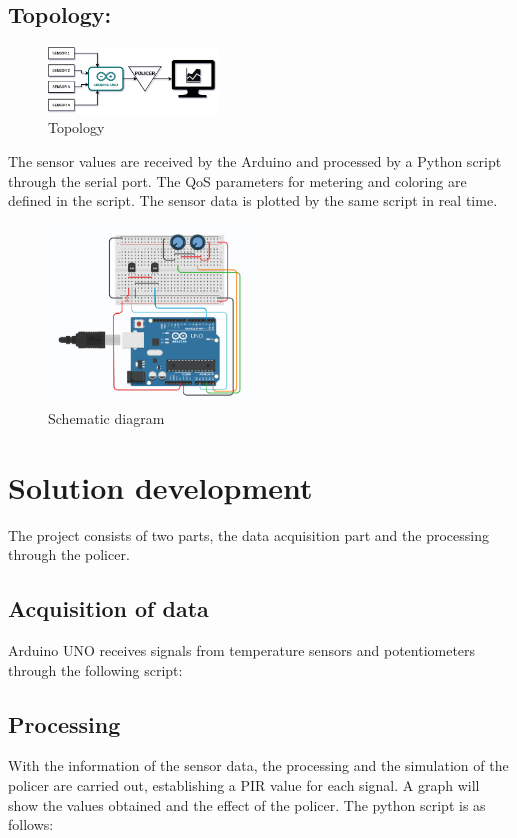 \documentclass[conference]{IEEEtran}
\begin{document}
\subsection{\textbf{ Topology:}}
\begin{figure}[h]
	\centerline{\includegraphics[width=0.4\textwidth]{img/topology01.png}}
	\caption{Topology}
	\label{fig:top01}
\end{figure}
The sensor values are received by the Arduino and processed by a Python script through the serial port. The QoS parameters for metering and coloring are defined in the script. The sensor data is plotted by the same script in real time.\\
\begin{figure}[h]
	\centerline{\includegraphics[width=0.5\textwidth]{img/topology.png}}
	\caption{Schematic diagram}
	\label{fig:top02}
\end{figure}

\section{Solution development}\label{sec:met}
The project consists of two parts, the data acquisition part and the processing through the policer.\\
\subsection{Acquisition of data}
Arduino UNO receives signals from temperature sensors and potentiometers through the following script:

\subsection{Processing}
With the information of the sensor data, the processing and the simulation of the policer are carried out, establishing a PIR value for each signal. A graph will show the values obtained and the effect of the policer.
The python script is as follows:

\end{document}
